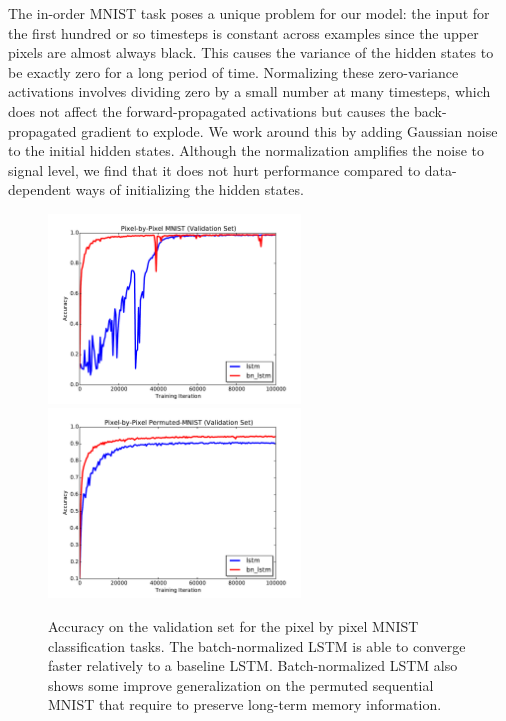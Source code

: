 \documentclass{article} %
\begin{document}
The in-order MNIST task poses a unique problem for our model:
the input for the first hundred or so timesteps is constant across examples since the upper pixels are almost always black.
This causes the variance of the hidden states to be exactly zero for a long period of time.
Normalizing these zero-variance activations involves dividing zero by a small number at many timesteps, which does not affect the forward-propagated activations but causes the back-propagated gradient to explode.
We work around this by adding Gaussian noise to the initial hidden states.
Although the normalization amplifies the noise to signal level, we find that it does not hurt performance compared to data-dependent ways of initializing the hidden states.

\begin{figure}[!t]
\center
\includegraphics[width=6.7cm]{figures/unpermuted_valid.pdf}
\includegraphics[width=6.7cm]{figures/permuted_valid.pdf}
\caption{Accuracy on the validation set for the pixel by pixel MNIST classification tasks. The batch-normalized LSTM is able to converge faster relatively to a baseline LSTM.
  Batch-normalized  LSTM also shows some improve generalization on the permuted sequential MNIST that require to preserve long-term memory information.}
\label{fig:seqmnist_valid}
\end{figure}
\end{document}
